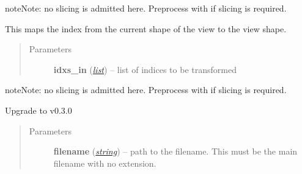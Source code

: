 \documentclass[a4paper,10pt,english]{sphinxmanual}
\begin{document}
\begin{fulllineitems}
\begin{fulllineitems}
\begin{notice}{note}{Note:}
no slicing is admitted here. Preprocess  with  if slicing is required.
\end{notice}

\end{fulllineitems}


\begin{fulllineitems}
\label{api-tw:TensorToolbox.core.TensorWrapper.shape_to_view}
This maps the index from the current shape of the view to the view shape.
\begin{quote}\begin{description}
\item[{Parameters}] \leavevmode
\textbf{idxs\_in} (\href{http://docs.python.org/library/functions.html\#list}{\emph{list}}) -- list of indices to be transformed

\end{description}\end{quote}

\begin{notice}{note}{Note:}
no slicing is admitted here. Preprocess  with  if slicing is required.
\end{notice}

\end{fulllineitems}


\begin{fulllineitems}
\label{api-tw:TensorToolbox.core.TensorWrapper.to_v_0_3_0}
Upgrade to v0.3.0
\begin{quote}\begin{description}
\item[{Parameters}] \leavevmode
\textbf{filename} (\href{http://docs.python.org/library/string.html\#module-string}{\emph{string}}) -- path to the filename. This must be the main filename with no extension.

\end{description}\end{quote}

\end{fulllineitems}


\end{fulllineitems}
\end{document}
